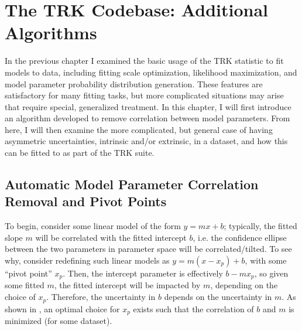 \chapter{The TRK Codebase: Additional Algorithms}
\label{cha:code2}
In the previous chapter I examined the basic usage of the TRK statistic to fit models to data, including fitting scale optimization, likelihood maximization, and model parameter probability distribution generation. These features are satisfactory for many fitting tasks, but more complicated situations may arise that require special, generalized treatment. In this chapter, I will first introduce an algorithm developed to remove correlation between model parameters. From here, I will then examine the more complicated, but general case of having asymmetric uncertainties, intrinsic and/or extrinsic, in a dataset, and how this can be fitted to as part of the TRK suite.

\section{Automatic Model Parameter Correlation Removal and Pivot Points}
\label{sec:pivot}
To begin, consider some linear model of the form $y=mx+b$; typically, the fitted slope $m$ will be correlated with the fitted intercept $b$, i.e. the confidence ellipse between the two parameters in parameter space will be correlated/tilted. To see why, consider redefining such linear models as $y=m(x-x_p)+b$, with some ``pivot point'' $x_p$. Then, the intercept parameter is effectively $b-mx_p$, so given some fitted $m$, the fitted intercept will be impacted by $m$, depending on the choice of $x_p$. Therefore, the uncertainty in $b$ depends on the uncertainty in $m$. As shown in \textcite{trotter}, an optimal choice for $x_p$ exists such that the correlation of $b$ and $m$ is minimized (for some dataset).

